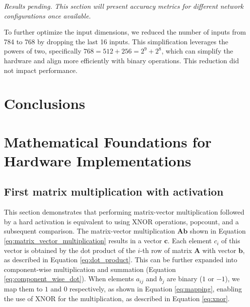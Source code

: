 \documentclass[conference,a4paper,flushend]{cs-techrep}
\begin{document}
\textit{Results pending. This section will present accuracy metrics for different network configurations once available.}



To further optimize the input dimensions, we reduced the number of inputs from 784 to 768 by dropping the last 16 inputs. This simplification leverages the powers of two, specifically \(768 = 512 + 256 = 2^9 + 2^8\), which can simplify the hardware and align more efficiently with binary operations. This reduction did not impact performance.


 








\section{Conclusions}




\appendix

\section{Mathematical Foundations for Hardware Implementations}

\subsection{First matrix multiplication with activation}

This section demonstrates that performing matrix-vector multiplication followed by a hard activation is equivalent to using XNOR operations, popcount, and a subsequent comparison.
The matrix-vector multiplication \(\mathbf{A} \mathbf{b}\) shown in Equation \ref{eq:matrix_vector_multiplication} results in a vector \(\mathbf{c}\). Each element \(c_i\) of this vector is obtained by the dot product of the \(i\)-th row of matrix \(\mathbf{A}\) with vector \(\mathbf{b}\), as described in Equation \ref{eq:dot_product}. This can be further expanded into component-wise multiplication and summation (Equation \ref{eq:component_wise_dot}). When elements \(a_{ij}\) and \(b_j\) are binary (\(1\) or \(-1\)), we map them to \(1\) and \(0\) respectively, as shown in Equation \ref{eq:mapping}, enabling the use of XNOR for the multiplication, as described in Equation \ref{eq:xnor}.
\end{document}
